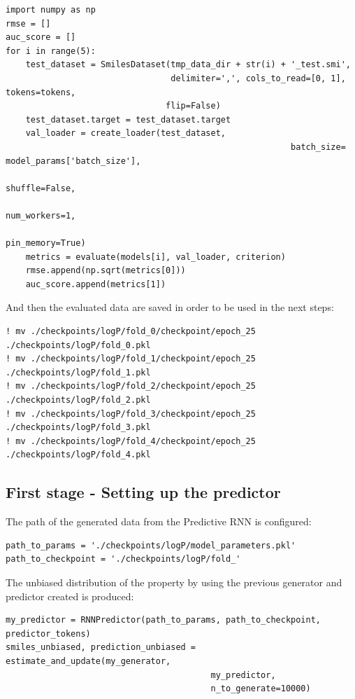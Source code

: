 \documentclass[a4paper]{article}
\begin{document}
\begin{lstlisting}
import numpy as np
rmse = []
auc_score = []
for i in range(5):
    test_dataset = SmilesDataset(tmp_data_dir + str(i) + '_test.smi',
                                 delimiter=',', cols_to_read=[0, 1], tokens=tokens,
                                flip=False)
    test_dataset.target = test_dataset.target
    val_loader = create_loader(test_dataset,
														 batch_size= model_params['batch_size'],
														 shuffle=False,
														 num_workers=1,
														 pin_memory=True)
    metrics = evaluate(models[i], val_loader, criterion)
    rmse.append(np.sqrt(metrics[0]))
    auc_score.append(metrics[1])
\end{lstlisting}

And then the evaluated data are saved in order to be used in the next steps:

\begin{lstlisting}
! mv ./checkpoints/logP/fold_0/checkpoint/epoch_25 ./checkpoints/logP/fold_0.pkl
! mv ./checkpoints/logP/fold_1/checkpoint/epoch_25 ./checkpoints/logP/fold_1.pkl
! mv ./checkpoints/logP/fold_2/checkpoint/epoch_25 ./checkpoints/logP/fold_2.pkl
! mv ./checkpoints/logP/fold_3/checkpoint/epoch_25 ./checkpoints/logP/fold_3.pkl
! mv ./checkpoints/logP/fold_4/checkpoint/epoch_25 ./checkpoints/logP/fold_4.pkl
\end{lstlisting}

\subsection{First stage - Setting up the predictor}\label{sec:First stage - Setting up the predictor}

The path of the generated data from the Predictive RNN is configured:

\begin{lstlisting}
path_to_params = './checkpoints/logP/model_parameters.pkl'
path_to_checkpoint = './checkpoints/logP/fold_'
\end{lstlisting}

The unbiased distribution of the property by using the previous generator and predictor created is produced:

\begin{lstlisting}
my_predictor = RNNPredictor(path_to_params, path_to_checkpoint, predictor_tokens)
smiles_unbiased, prediction_unbiased = estimate_and_update(my_generator,
										 my_predictor,
										 n_to_generate=10000)
\end{lstlisting}
\end{document}
